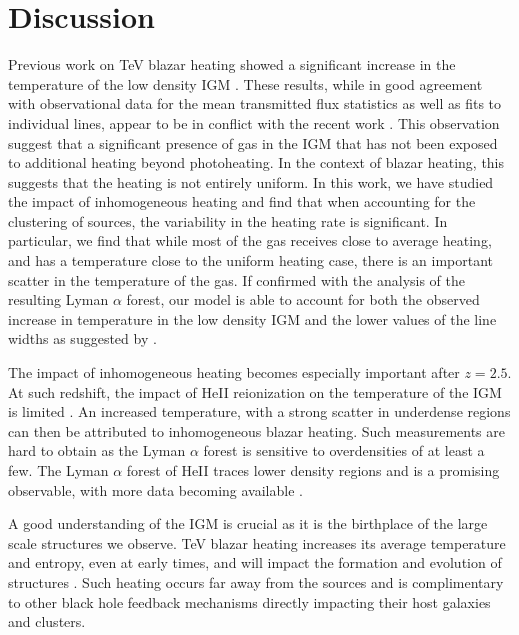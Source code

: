 \documentclass[twocolumns]{emulateapj}
\begin{document}
\section{Discussion}

Previous work on TeV blazar heating showed a significant increase in the temperature of the low density IGM \citep{2012ApJ...752...23C,2012MNRAS.423..149P}.  These results, while in good agreement with  observational data for the mean transmitted flux statistics as well as fits to individual lines, appear to be in conflict with the recent work \citep{2012ApJ...757L..30R}.  This observation suggest that a significant presence of gas in the IGM that has not been exposed to additional heating beyond photoheating.  In the context of blazar heating, this suggests that the heating is not entirely uniform.  In this work, we have studied the impact of inhomogeneous heating and find that when accounting for the clustering of sources, the variability in the heating rate is significant.  In particular, we find that while most of the gas receives close to average heating, and has a temperature close to the uniform heating case, there is an important scatter in the temperature of the gas. If confirmed with the analysis of the resulting Lyman $\alpha$ forest, our model is able to account for both the observed increase in temperature in the low density IGM \citep{2014MNRAS.441.1916B,2009MNRAS.399L..39V} and the lower values  of the line widths as suggested by \citet{2012ApJ...757L..30R}.

The impact of inhomogeneous heating becomes especially  important after $z=2.5$. At such redshift, the impact of HeII reionization  on the temperature of the IGM is  limited \citep{2013MNRAS.435.3169C}. An increased temperature, with a strong scatter in underdense regions can then be attributed to inhomogeneous blazar heating. Such measurements are hard to obtain as the Lyman $\alpha$ forest is sensitive to overdensities of at least a few.  The Lyman $\alpha$ forest of HeII traces lower density regions and is a promising observable, with more data becoming available \citep{2014arXiv1405.7405W}.

A good understanding of the IGM is crucial as it is the birthplace of the large scale structures we observe. TeV blazar heating increases its average temperature and entropy, even at early times, and will impact the formation and evolution of  structures \citep{2012ApJ...752...24P}. Such heating occurs far away from the sources and  is complimentary to other black hole feedback mechanisms directly impacting their host galaxies and clusters.
\end{document}

